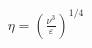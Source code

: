 \documentclass[preview]{standalone}
\begin{document}
\begin{align*}
\eta = \left( \frac{\nu^3}{\varepsilon} \right)^{1/4}
\end{align*}
\end{document}
